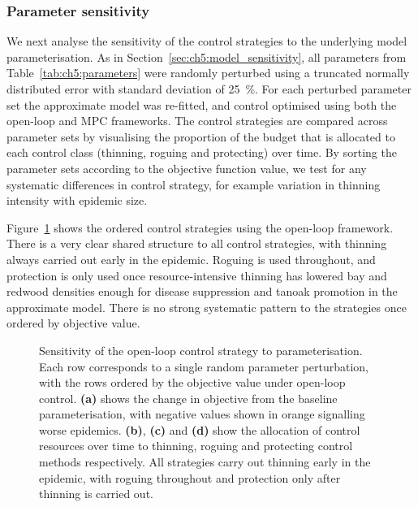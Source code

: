 \subsubsection{Parameter sensitivity}

We next analyse the sensitivity of the control strategies to the underlying model parameterisation. As in Section~\ref{sec:ch5:model_sensitivity}, all parameters from Table~\ref{tab:ch5:parameters} were randomly perturbed using a truncated normally distributed error with standard deviation of \SI{25}{\percent}. For each perturbed parameter set the approximate model was re-fitted, and control optimised using both the open-loop and MPC frameworks. The control strategies are compared across parameter sets by visualising the proportion of the budget that is allocated to each control class (thinning, roguing and protecting) over time. By sorting the parameter sets according to the objective function value, we test for any systematic differences in control strategy, for example variation in thinning intensity with epidemic size.

Figure~\ref{fig:ch6:ol_sensitivity} shows the ordered control strategies using the open-loop framework. There is a very clear shared structure to all control strategies, with thinning always carried out early in the epidemic. Roguing is used throughout, and protection is only used once resource-intensive thinning has lowered bay and redwood densities enough for disease suppression and tanoak promotion in the approximate model. There is no strong systematic pattern to the strategies once ordered by objective value.

\begin{figure}[t]
    \begin{center}
        \caption[Open-loop control parameter sensitivity]{Sensitivity of the open-loop control strategy to parameterisation. Each row corresponds to a single random parameter perturbation, with the rows ordered by the objective value under open-loop control. \textbf{(a)} shows the change in objective from the baseline parameterisation, with negative values shown in orange signalling worse epidemics. \textbf{(b)}, \textbf{(c)} and \textbf{(d)} show the allocation of control resources over time to thinning, roguing and protecting control methods respectively. All strategies carry out thinning early in the epidemic, with roguing throughout and protection only after thinning is carried out.\label{fig:ch6:ol_sensitivity}}
    \end{center}
\end{figure}

